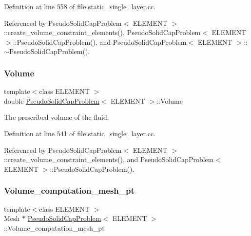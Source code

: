 Definition at line 558 of file static\+\_\+single\+\_\+layer.\+cc.



Referenced by Pseudo\+Solid\+Cap\+Problem$<$ E\+L\+E\+M\+E\+N\+T $>$\+::create\+\_\+volume\+\_\+constraint\+\_\+elements(), Pseudo\+Solid\+Cap\+Problem$<$ E\+L\+E\+M\+E\+N\+T $>$\+::\+Pseudo\+Solid\+Cap\+Problem(), and Pseudo\+Solid\+Cap\+Problem$<$ E\+L\+E\+M\+E\+N\+T $>$\+::$\sim$\+Pseudo\+Solid\+Cap\+Problem().

\mbox{\label{classPseudoSolidCapProblem_a49945d8e5740977a72c63e333a65293f}} 
\subsubsection{\texorpdfstring{Volume}{Volume}}
{\footnotesize\ttfamily template$<$class E\+L\+E\+M\+E\+NT $>$ \\
double \hyperlink{classPseudoSolidCapProblem}{Pseudo\+Solid\+Cap\+Problem}$<$ E\+L\+E\+M\+E\+NT $>$\+::Volume\hspace{0.3cm}{\ttfamily [private]}}



The prescribed volume of the fluid. 



Definition at line 541 of file static\+\_\+single\+\_\+layer.\+cc.



Referenced by Pseudo\+Solid\+Cap\+Problem$<$ E\+L\+E\+M\+E\+N\+T $>$\+::create\+\_\+volume\+\_\+constraint\+\_\+elements(), and Pseudo\+Solid\+Cap\+Problem$<$ E\+L\+E\+M\+E\+N\+T $>$\+::\+Pseudo\+Solid\+Cap\+Problem().

\mbox{\label{classPseudoSolidCapProblem_a173d08853c11d0692a4e922bc3fcf53f}} 
\subsubsection{\texorpdfstring{Volume\+\_\+computation\+\_\+mesh\+\_\+pt}{Volume\_computation\_mesh\_pt}}
{\footnotesize\ttfamily template$<$class E\+L\+E\+M\+E\+NT $>$ \\
Mesh $\ast$ \hyperlink{classPseudoSolidCapProblem}{Pseudo\+Solid\+Cap\+Problem}$<$ E\+L\+E\+M\+E\+NT $>$\+::Volume\+\_\+computation\+\_\+mesh\+\_\+pt\hspace{0.3cm}{\ttfamily [private]}}



